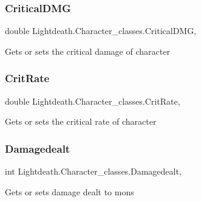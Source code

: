 \subsubsection{\texorpdfstring{Critical\+D\+MG}{CriticalDMG}}
{\footnotesize\ttfamily double Lightdeath.\+Character\+\_\+classes.\+Critical\+D\+MG\hspace{0.3cm}{\ttfamily [get]}, {\ttfamily [set]}}



Gets or sets the critical damage of character 

\hypertarget{class_lightdeath_1_1_character__classes_af9bda19058c993e15be0f0aab18d6a45}{}\label{class_lightdeath_1_1_character__classes_af9bda19058c993e15be0f0aab18d6a45} 
\subsubsection{\texorpdfstring{Crit\+Rate}{CritRate}}
{\footnotesize\ttfamily double Lightdeath.\+Character\+\_\+classes.\+Crit\+Rate\hspace{0.3cm}{\ttfamily [get]}, {\ttfamily [set]}}



Gets or sets the critical rate of character 

\hypertarget{class_lightdeath_1_1_character__classes_abf554331e6ef4641f098e74e23a9148e}{}\label{class_lightdeath_1_1_character__classes_abf554331e6ef4641f098e74e23a9148e} 
\subsubsection{\texorpdfstring{Damagedealt}{Damagedealt}}
{\footnotesize\ttfamily int Lightdeath.\+Character\+\_\+classes.\+Damagedealt\hspace{0.3cm}{\ttfamily [get]}, {\ttfamily [set]}}



Gets or sets damage dealt to mons 

\hypertarget{class_lightdeath_1_1_character__classes_a60150e2ffd089f478e11d563debaa347}{}\label{class_lightdeath_1_1_character__classes_a60150e2ffd089f478e11d563debaa347} 
